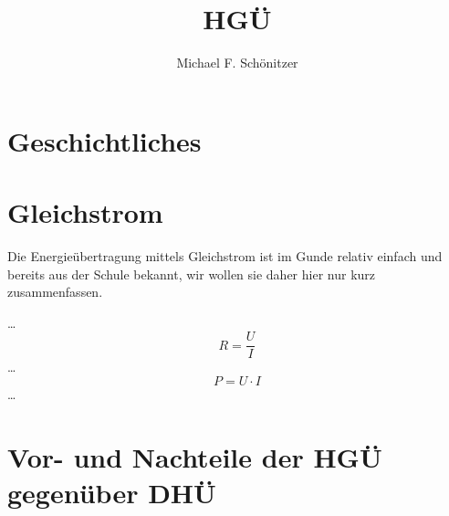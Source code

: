 \documentclass[10pt,a4paper]{article}
\author{Michael F. Schönitzer}
\title{HGÜ}
\begin{document}
\maketitle

\section{Geschichtliches}

\section{Gleichstrom}
Die Energieübertragung mittels Gleichstrom ist im Gunde relativ einfach und bereits aus der Schule bekannt, wir wollen sie daher hier nur kurz zusammenfassen.

…
\begin{equation}
R = \frac{U}{I}
\end{equation}
…
\begin{equation}
P = U \cdot I
\end{equation}
…



\section{Vor- und Nachteile der HGÜ gegenüber DHÜ}
\end{document}
